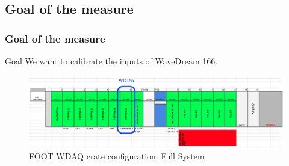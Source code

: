 \subsection{Goal of the measure}
\begin{frame} [fragile]
\small
	\frametitle{Goal of the measure}
	\begin{block}{Goal}
		We want to calibrate the inputs of WaveDream 166.
		 
	\end{block}
	
    	\begin{figure}
	\centering
		\includegraphics[scale=0.3]{figures/crate_configuration/wd166.png}
		
		\caption{FOOT WDAQ crate configuration. Full System}
	\end{figure}  
	
\end{frame}